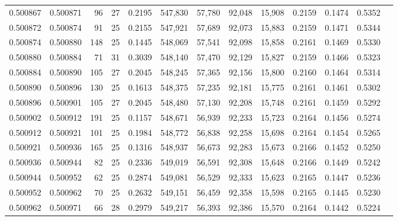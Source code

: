 \begin{tabular}{rrrrrrrrrrrrr}
0.500867 & 0.500871 &  96 &  27 &                                     0.2195 & 547,830 &  57,780 &  92,048 &  15,908 & 0.2159 & 0.1474 & 0.5352 \\
0.500872 & 0.500874 &  91 &  25 &                                     0.2155 & 547,921 &  57,689 &  92,073 &  15,883 & 0.2159 & 0.1471 & 0.5344 \\
0.500874 & 0.500880 & 148 &  25 &                                     0.1445 & 548,069 &  57,541 &  92,098 &  15,858 & 0.2161 & 0.1469 & 0.5330 \\
0.500880 & 0.500884 &  71 &  31 &                                     0.3039 & 548,140 &  57,470 &  92,129 &  15,827 & 0.2159 & 0.1466 & 0.5323 \\
0.500884 & 0.500890 & 105 &  27 &                                     0.2045 & 548,245 &  57,365 &  92,156 &  15,800 & 0.2160 & 0.1464 & 0.5314 \\
0.500890 & 0.500896 & 130 &  25 &                                     0.1613 & 548,375 &  57,235 &  92,181 &  15,775 & 0.2161 & 0.1461 & 0.5302 \\
0.500896 & 0.500901 & 105 &  27 &                                     0.2045 & 548,480 &  57,130 &  92,208 &  15,748 & 0.2161 & 0.1459 & 0.5292 \\
0.500902 & 0.500912 & 191 &  25 &                                     0.1157 & 548,671 &  56,939 &  92,233 &  15,723 & 0.2164 & 0.1456 & 0.5274 \\
0.500912 & 0.500921 & 101 &  25 &                                     0.1984 & 548,772 &  56,838 &  92,258 &  15,698 & 0.2164 & 0.1454 & 0.5265 \\
0.500921 & 0.500936 & 165 &  25 &                                     0.1316 & 548,937 &  56,673 &  92,283 &  15,673 & 0.2166 & 0.1452 & 0.5250 \\
0.500936 & 0.500944 &  82 &  25 &                                     0.2336 & 549,019 &  56,591 &  92,308 &  15,648 & 0.2166 & 0.1449 & 0.5242 \\
0.500944 & 0.500952 &  62 &  25 &                                     0.2874 & 549,081 &  56,529 &  92,333 &  15,623 & 0.2165 & 0.1447 & 0.5236 \\
0.500952 & 0.500962 &  70 &  25 &                                     0.2632 & 549,151 &  56,459 &  92,358 &  15,598 & 0.2165 & 0.1445 & 0.5230 \\
0.500962 & 0.500971 &  66 &  28 &                                     0.2979 & 549,217 &  56,393 &  92,386 &  15,570 & 0.2164 & 0.1442 & 0.5224 \\

\end{tabular}

